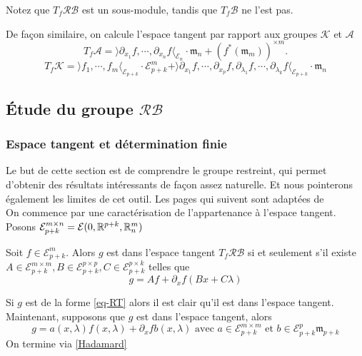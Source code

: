 \documentclass[memoire.tex]{subfiles}
\begin{document}
Notez que $T_f\mathcal{RB}$ est un sous-module, tandis que $T_f\mathcal{B}$ ne l'est pas.

\begin{exemple}
    De façon similaire, on calcule l'espace tangent par rapport aux groupes $\mathcal{K}$ et $\mathcal{A}$
    \begin{equation*}
    T_f\mathcal{A}=\rangle\partial_{x_1}f,\cdots,\partial_{x_n}f\langle_{\mathcal{E}_n}\cdot\mathfrak{m}_n+\left(f^*(\mathfrak{m}_m)\right)^{\times m}.
    \end{equation*}
    \begin{equation*}
        T_f\mathcal{K} = \rangle f_1, \cdots, f_m \langle_{\mathcal{E}_{p+k}} \cdot \mathcal{E}_{p+k}^m + \rangle \partial_{x_1}f, \cdots, \partial_{x_p}f, \partial_{\lambda_1}f, \cdots, \partial_{\lambda_k}f \langle_{\mathcal{E}_{p+k}}\cdot \mathfrak{m}_n
    \end{equation*}
\end{exemple}

\subsection{Étude du groupe $\mathcal{RB}$}
\subsubsection{Espace tangent et détermination finie}
Le but de cette section est de comprendre le groupe restreint, qui permet d'obtenir des résultats intéressants de façon assez naturelle. Et nous pointerons également les limites de cet outil. Les pages qui suivent sont adaptées de \cite{golubitsky1985sgb1}\\
On commence par une caractérisation de l'appartenance à l'espace tangent. Posons $\mathcal{E}_{p+k}^{m\times n}=\mathcal{E}(0,\mathbb{R}^{p+k},\mathbb{R}^m_n)$
\begin{lemme}\label{Lemm-tg-reecriture}
    Soit $f\in\mathcal{E}_{p+k}^m$. Alors $g$ est dans l'espace tangent $T_f \mathcal{RB}$ si et seulement s'il existe $A\in\mathcal{E}_{p+k}^{m\times m},B\in\mathcal{E}^{p\times p}_{p+k},C\in\mathcal{E}^{p\times k}_{p+k}$ telles que
    \begin{equation}\label{eq-RT}
        g=Af+\partial_x f(Bx+C\lambda)
    \end{equation}
\end{lemme}
\begin{preuve}
    Si $g$ est de la forme \ref{eq-RT} alors il est clair qu'il est dans l'espace tangent. Maintenant, supposons que $g$ est dans l'espace tangent, alors 
    \begin{equation*}
        g=a(x,\lambda)f(x,\lambda)+ \partial_x f b(x,\lambda)\text{ avec }a\in\mathcal{E}_{p+k}^{m\times m}\text{ et }b\in\mathcal{E}^p_{p+k}\mathfrak{m}_{p+k}
    \end{equation*}
    On termine via \ref{Hadamard}
\end{preuve}
\end{document}
